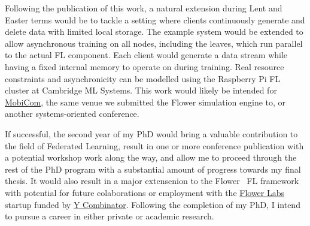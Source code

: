 Following the publication of this work, a natural extension during Lent and Easter terms would be to tackle a setting where clients continuously generate and delete data with limited local storage. The example system would be extended to allow asynchronous training on all nodes, including the leaves, which run parallel to the actual FL component. Each client would generate a data stream while having a fixed internal memory to operate on during training. Real resource constraints and asynchronicity can be modelled using the Raspberry Pi FL cluster at Cambridge ML Systems. This work would likely be intended for \href{https://sigmobile.org/mobicom/2023/}{MobiCom}, the same venue we submitted the Flower simulation engine to, or another systems-oriented conference.

If successful, the second year of my PhD would bring a valuable contribution to the field of Federated Learning, result in one or more conference publication with a potential workshop work along the way, and allow me to proceed through the rest of the PhD program with a substantial amount of progress towards my final thesis. It would also result in a major extensenion to the Flower~\citep{Flower} FL framework with potential for future colaborations or employment with the  \href{https://flower.dev/blog/2023-03-08-flower-labs/}{Flower Labs} startup funded by \href{https://www.ycombinator.com/}{Y Combinator}. Following the completion of my PhD, I intend to pursue a career in either private or academic research.